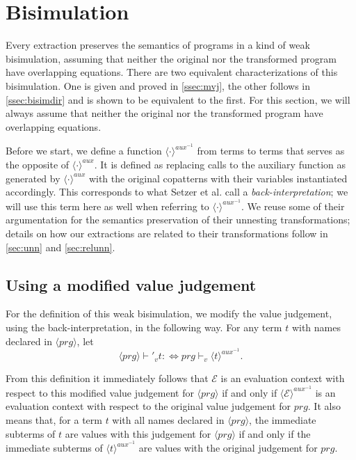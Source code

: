 \section{Bisimulation}
\label{sec:extrbis}

Every extraction preserves the semantics of programs in a kind of weak bisimulation, assuming that neither the original nor the transformed program have overlapping equations. There are two equivalent characterizations of this bisimulation. One is given and proved in \autoref{ssec:mvj}, the other follows in \autoref{ssec:bisimdir} and is shown to be equivalent to the first. For this section, we will always assume that neither the original nor the transformed program have overlapping equations.

Before we start, we define a function $\langle \cdot \rangle^{aux^{-1}}$ from terms to terms that serves as the opposite of $\langle \cdot \rangle^{aux}$. It is defined as replacing calls to the auxiliary function as generated by $\langle \cdot \rangle^{aux}$ with the original copatterns with their variables instantiated accordingly. This corresponds to what Setzer et al.\cite{setzer14unnesting} call a \textit{back-interpretation}; we will use this term here as well when referring to $\langle \cdot \rangle^{aux^{-1}}$. We reuse some of their argumentation for the semantics preservation of their unnesting transformations; details on how our extractions are related to their transformations follow in \autoref{sec:unn} and \autoref{sec:relunn}.

\subsection{Using a modified value judgement}
\label{ssec:mvj}

For the definition of this weak bisimulation, we modify the value judgement, using the back-interpretation, in the following way. For any term $t$ with names declared in $\langle prg \rangle$, let
\[
\langle prg \rangle \vdash'_v t :\iff prg \vdash_v \langle t \rangle^{aux^{-1}}.
\]

From this definition it immediately follows that $\mathcal{E}$ is an evaluation context with respect to this modified value judgement for $\langle prg \rangle$ if and only if $\langle \mathcal{E} \rangle^{aux^{-1}}$ is an evaluation context with respect to the original value judgement for $prg$. It also means that, for a term $t$ with all names declared in $\langle prg \rangle$, the immediate subterms of $t$ are values with this judgement for $\langle prg \rangle$ if and only if the immediate subterms of $\langle t \rangle^{aux^{-1}}$ are values with the original judgement for $prg$.

